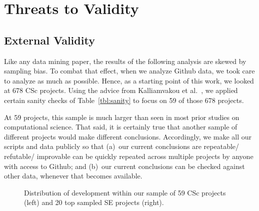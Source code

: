 \documentclass[conference,10pt]{IEEEtran}
\begin{document}
\section{Threats to Validity}

\subsection{External Validity}
Like any data mining paper,
the results of the following analysis are skewed by sampling bias.
To combat that effect, when we analyze Github data, we took care to analyze as much as possible.
Hence,
as a starting point of this work, we looked at 678 CSc projects. 
Using the advice from Kalliamvakou et al.~\cite{Kalliamvakou:2014}, we applied certain sanity checks of Table~\ref{tbl:sanity}  to focus on 59 of those 678 projects.

At 59 projects, this sample is much larger than seen in
most prior studies on computational
science. That said, it is certainly true that another sample of different projects would make different conclusions.
Accordingly, we make all our scripts and data publicly so that
(a)~our current conclusions
are repeatable/ refutable/ improvable can be quickly repeated across multiple projects by anyone with access to Github; and (b)~our current conclusions can be checked against other data, whenever that becomes available.


\begin{figure}[!t]
\vspace{-15pt}
\begin{center}
 
\end{center}
\vspace{-10pt}
\caption{Distribution of development within our sample of 59 CSc projects (left) and 20 top sampled SE projects (right).}
\label{fig:SE_activities}
\vspace{-5pt}
\end{figure}
\end{document}
